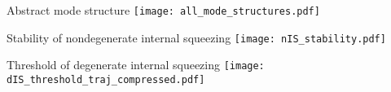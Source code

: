 \documentclass[12pt,xcolor=dvipsnames]{beamer}
\begin{document}
\begin{frame}[noframenumbering]{Abstract mode structure}
\centering
\texttt{[image: all\_mode\_structures.pdf]}
\end{frame}

\begin{frame}[noframenumbering]{Stability of nondegenerate internal squeezing}
\centering
\texttt{[image: nIS\_stability.pdf]}
\end{frame}

\begin{frame}[noframenumbering]{Threshold of degenerate internal squeezing}
\centering
\texttt{[image: dIS\_threshold\_traj\_compressed.pdf]}
\end{frame}
\end{document}
